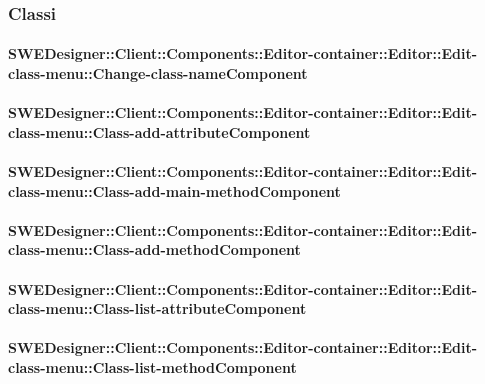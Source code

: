          \subsubsection{Classi}
         
			\paragraph{SWEDesigner::Client::Components::Editor-container::Editor::Edit-class-menu::Change-class-nameComponent}
				
				
			\paragraph{SWEDesigner::Client::Components::Editor-container::Editor::Edit-class-menu::Class-add-attributeComponent}
				
				
			\paragraph{SWEDesigner::Client::Components::Editor-container::Editor::Edit-class-menu::Class-add-main-methodComponent}
				
				
			\paragraph{SWEDesigner::Client::Components::Editor-container::Editor::Edit-class-menu::Class-add-methodComponent}
				
				
			\paragraph{SWEDesigner::Client::Components::Editor-container::Editor::Edit-class-menu::Class-list-attributeComponent}
				
				
			\paragraph{SWEDesigner::Client::Components::Editor-container::Editor::Edit-class-menu::Class-list-methodComponent}
				
				
